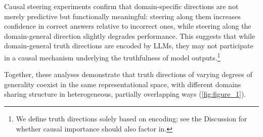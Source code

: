 \documentclass{article}
\theoremstyle{plain}
\theoremstyle{definition}
\theoremstyle{remark}
\begin{document}
Causal steering experiments confirm that domain-specific directions are not merely predictive but functionally meaningful: steering along them increases confidence in correct answers relative to incorrect ones, while steering along the domain-general direction slightly degrades performance. This suggests that while domain-general truth directions are encoded by LLMs, they may not participate in a causal mechanism underlying the truthfulness of model outputs.\footnote{We define truth directions solely based on encoding; see the Discussion for whether causal importance should also factor in.}

Together, these analyses demonstrate that truth directions of varying degrees of generality coexist in the same representational space, with different domains sharing structure in heterogeneous, partially overlapping ways (\cref{fig:figure_1}). 

\end{document}
